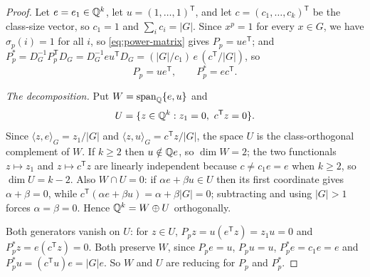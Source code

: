 \begin{proof}
Let \(e=e_1\in\mathbb Q^k\), let \(u=(1,\ldots,1)^{\mathsf T}\), and let
\(c=(c_1,\ldots,c_k)^{\mathsf T}\) be the class-size vector, so \(c_1=1\) and
\(\sum_ic_i=|G|\).  Since \(x^p=1\) for every \(x\in G\), we have
\(\sigma_p(i)=1\) for all \(i\), so \eqref{eq:power-matrix} gives
\(P_p=ue^{\mathsf T}\); and
\(P_p^*=D_G^{-1}P_p^{\mathsf T}D_G
=D_G^{-1}eu^{\mathsf T}D_G=(|G|/c_1)\,e\,(c^{\mathsf T}/|G|)\), so
\begin{equation}
 P_p=ue^{\mathsf T},
 \qquad
 P_p^*=ec^{\mathsf T}.
 \label{eq:prime-rank-one-matrices}
\end{equation}

\emph{The decomposition.}  Put \(W=\operatorname{span}_\mathbb Q\{e,u\}\) and
\[
 U=\{z\in\mathbb Q^k:z_1=0,\ c^{\mathsf T}z=0\}.
\]
Since \(\langle z,e\rangle_G=z_1/|G|\) and
\(\langle z,u\rangle_G=c^{\mathsf T}z/|G|\), the space \(U\) is the
class-orthogonal complement of \(W\).  If \(k\geq2\) then \(u\notin\mathbb Q e\), so
\(\dim W=2\); the two functionals \(z\mapsto z_1\) and
\(z\mapsto c^{\mathsf T}z\) are linearly independent because
\(c\neq c_1e=e\) when \(k\geq2\), so \(\dim U=k-2\).  Also
\(W\cap U=0\): if \(\alpha e+\beta u\in U\) then its first coordinate gives
\(\alpha+\beta=0\), while
\(c^{\mathsf T}(\alpha e+\beta u)=\alpha+\beta|G|=0\); subtracting and using
\(|G|>1\) forces \(\alpha=\beta=0\).  Hence
\(\mathbb Q^k=W\oplus U\) orthogonally.

Both generators vanish on \(U\): for \(z\in U\),
\(P_pz=u(e^{\mathsf T}z)=z_1u=0\) and
\(P_p^*z=e(c^{\mathsf T}z)=0\).  Both preserve \(W\), since
\(P_pe=u\), \(P_pu=u\), \(P_p^*e=c_1e=e\) and \(P_p^*u=(c^{\mathsf T}u)e=|G|e\).
So \(W\) and \(U\) are reducing for \(P_p\) and \(P_p^*\).


\end{proof}
